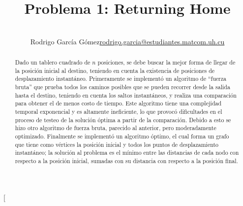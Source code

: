 \documentclass[a4paper,12pt,twocolumn]{article}
\title{Problema 1: Returning Home}
\author{\\
\name Rodrigo García Gómez\email \href{mailto:rodrigo.garcia@estudiantes.matcom.uh.cu}{rodrigo.garcia@estudiantes.matcom.uh.cu}
}
\begin{document}

\twocolumn[
\maketitle


\begin{abstract}
Dado un tablero cuadrado de $n$ posiciones, se debe buscar la mejor forma de llegar de la posición inicial al destino, teniendo en cuenta la existencia de posiciones de desplazamiento instantáneo.
Primeramente se implementó un algoritmo de “fuerza bruta” que prueba todos los caminos posibles que se pueden recorrer desde la salida hasta el destino, teniendo en cuenta los saltos instantáneos, y realiza una comparación para obtener el de menos costo de tiempo. Este algoritmo tiene una complejidad temporal exponencial y es altamente ineficiente, lo que provocó dificultades en el proceso de testeo de la solución óptima a partir de la comparación. Debido a esto se hizo otro algoritmo de fuerza bruta, parecido al anterior, pero moderadamente optimizado. Finalmente se implementó un algoritmo óptimo, el cual forma un grafo que tiene como vértices la posición inicial y todos los puntos de desplazamiento instantáneo; la solución al problema es el mínimo entre las distancias de cada nodo con respecto a la posición inicial, sumadas con su distancia con respecto a la posición final.
\end{abstract}

\vspace{0.5cm}



\end{document}
